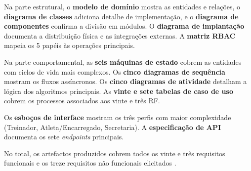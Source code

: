 Na parte estrutural, o \textbf{modelo de domínio} mostra as entidades e relações, o \textbf{diagrama de classes} adiciona detalhe de implementação, e o \textbf{diagrama de componentes} confirma a divisão em módulos. O \textbf{diagrama de implantação} documenta a distribuição física e as integrações externas. A \textbf{matriz RBAC} mapeia os 5 papéis às operações principais.

Na parte comportamental, as \textbf{seis máquinas de estado} cobrem as entidades com ciclos de vida mais complexos. Os \textbf{cinco diagramas de sequência} mostram os fluxos assíncronos. Os \textbf{cinco diagramas de atividade} detalham a lógica dos algoritmos principais. As \textbf{vinte e sete tabelas de caso de uso} cobrem os processos associados aos vinte e três RF.

Os \textbf{esboços de interface} mostram os três perfis com maior complexidade (Treinador, Atleta/Encarregado, Secretaria). A \textbf{especificação de API} documenta os sete \textit{endpoints} principais.

No total, os artefactos produzidos cobrem todos os vinte e três requisitos funcionais e os treze requisitos não funcionais elicitados \cite{sommerville2015}.

